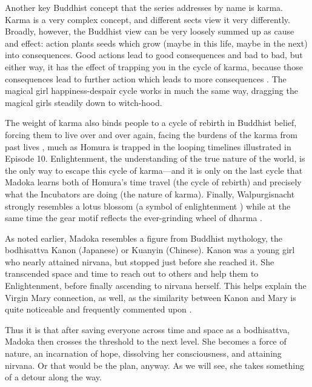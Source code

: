 Another key Buddhist concept that the series addresses by name is karma. Karma is a very complex concept, and different sects view it very differently. Broadly, however, the Buddhist view can be very loosely summed up as cause and effect: action plants seeds which grow (maybe in this life, maybe in the next) into consequences. Good actions lead to good consequences and bad to bad, but either way, it has the effect of trapping you in the cycle of karma, because those consequences lead to further action which leads to more consequences \cite{ref98}. The magical girl happiness-despair cycle works in much the same way, dragging the magical girls steadily down to witch-hood. 

The weight of karma also binds people to a cycle of rebirth in Buddhist belief, forcing them to live over and over again, facing the burdens of the karma from past lives \cite{ref99}, much as Homura is trapped in the looping timelines illustrated in Episode 10. Enlightenment, the understanding of the true nature of the world, is the only way to escape this cycle of karma—and it is only on the last cycle that Madoka learns both of Homura's time travel (the cycle of rebirth) and precisely what the Incubators are doing (the nature of karma). Finally, Walpurgisnacht strongly resembles a lotus blossom (a symbol of enlightenment \cite{ref100}) while at the same time the gear motif reflects the ever-grinding wheel of dharma \cite{ref101}. 

As noted earlier, Madoka resembles a figure from Buddhist mythology, the bodhisattva Kanon (Japanese) or Kuanyin (Chinese). Kanon was a young girl who nearly attained nirvana, but stopped just before she reached it. She transcended space and time to reach out to others and help them to Enlightenment, before finally ascending to nirvana herself. This helps explain the Virgin Mary connection, as well, as the similarity between Kanon and Mary is quite noticeable and frequently commented upon \cite{ref102}. 

Thus it is that after saving everyone across time and space as a bodhisattva, Madoka then crosses the threshold to the next level. She becomes a force of nature, an incarnation of hope, dissolving her consciousness, and attaining nirvana.
Or that would be the plan, anyway. As we will see, she takes something of a detour along the way.
